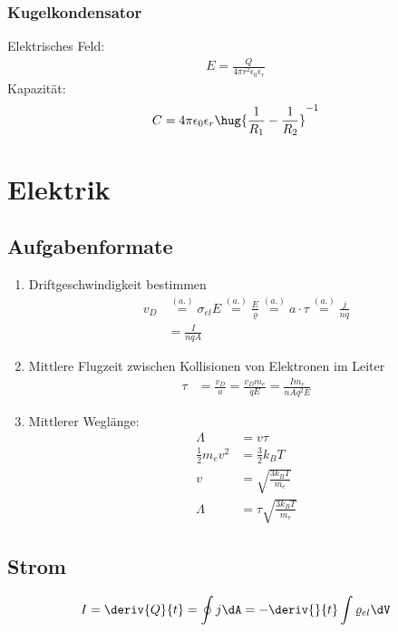 \documentclass[11pt,letterpaper]{article}
\newcommand\alt{\overset{(a.)}{=}}
\begin{document}
\subsubsection{Kugelkondensator}
Elektrisches Feld:
\begin{align*}
    E = \frac{Q}{4\pi r^2 \epsilon_0\epsilon_r}
\end{align*}
Kapazität:
\begin{align*}
    C = 4\pi \epsilon_0\epsilon_r\hug{\frac{1}{R_1} - \frac{1}{R_2}}^{-1} 
\end{align*}

\section{Elektrik}
\subsection{Aufgabenformate}
\begin{enumerate}
    \item Driftgeschwindigkeit bestimmen
    \begin{align*}
        v_D &\alt \sigma_{el} E \alt \frac{E}{\varrho} \alt  a\cdot \tau \alt \frac{j}{n q} \\
        &= \frac{I}{n q A}
    \end{align*}
    \item Mittlere Flugzeit zwischen Kollisionen von Elektronen im Leiter
    \begin{align*}
        \tau &= \frac{v_D}{a} = \frac{v_D m_e}{qE} 
        =\frac{I m_e}{n A q^2 E} 
    \end{align*}
    \item Mittlerer Weglänge:
    \begin{align*}
        \Lambda &=  v \tau\\
        \frac{1}{2}m_e v^2 &= \frac{3}{2}k_B T\\
        v &= \sqrt{\frac{3k_B T}{m_e }}\\
        \Lambda &= \tau \sqrt{\frac{3k_B T}{m_e }}
    \end{align*}
\end{enumerate}

\subsection{Strom}
\begin{align*}
    I &= \deriv{Q}{t} = \oint j \dA = - \deriv{}{t}\int \varrho_{el} \dV\\
\end{align*}
\end{document}
